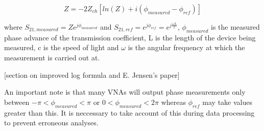 \begin{equation}
Z = -2Z_{ch}\left[ ln\left(Z\right) + i(\phi_{measured} - \phi_{ref}) \right]
\end{equation}

where $S_{21,measured} = Ze^{j\phi_{measured}}$ and $S_{21,ref}  = e^{j\phi_{ref}} = e^{j\frac{\omega L}{c}}$, $\phi_{measured}$ is the measured phase advance of the transmission coefficient, L is the length of the device being measured, c is the speed of light and $\omega$ is the angular frequency at which the measurement is carried out at.

[section on improved log formula and E. Jensen's paper]

An important note is that many VNAs will output phase measurements only between $-\pi < \phi_{measured} < \pi$ or $0 < \phi_{measured} < 2\pi$ whereas $\phi_{ref}$ may take values greater than this. It is neccessary to take account of this during data processing to prevent erroneous analyses.

